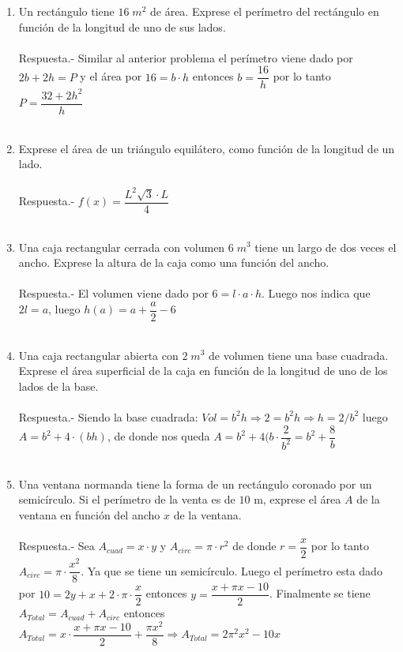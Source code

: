 \begin{enumerate}
    \item Un rectángulo tiene $16\; m^2$  de área. Exprese el perímetro del rectángulo en función de la longitud de uno de sus lados.\\\\
	Respuesta.-\; Similar al anterior problema el perímetro viene dado por $2b+2h=P$  y el área por $16=b\cdot h$ entonces $b=\dfrac{16}{h}$ por lo tanto $P=\dfrac{32+2h^2}{h}$\\\\ 

    \item Exprese el área de un triángulo equilátero, como función de la longitud de un lado.\\\\
	Respuesta.-\; $f(x)=\dfrac{L^2 \sqrt{3}\cdot L}{4}$\\\\

    \item Una caja rectangular cerrada con volumen $6\; m^3$ tiene un largo de dos veces el ancho. Exprese la altura de la caja como una función del ancho.\\\\
	Respuesta.-\; El volumen viene dado por $6=l\cdot a \cdot h$. Luego nos indica que $2l=a$, luego $h(a)=a + \dfrac{a}{2} - 6$\\\\

    \item Una caja rectangular abierta con $2 \; m^3$  de volumen tiene una base cuadrada. Exprese el área superficial de la caja en función de la longitud de uno de los lados de la base.\\\\
	Respuesta.-\; Siendo la base cuadrada:  $Vol=b^2h \Longrightarrow  2=b^2h \Longrightarrow  h=2/b^2$ luego $A=b^2 + 4\cdot (bh)$, de donde nos queda $A=b^2 + 4(b \cdot \dfrac{2}{b^2} = b^2 + \dfrac{8}{b}$\\\\

    \item Una ventana normanda tiene la forma de un rectángulo coronado por un semicírculo. Si el perímetro de la venta es de $10$ m, exprese el área $A$ de la ventana en función del ancho $x$ de la ventana.\\\\
	Respuesta.-\; Sea $A_{cuad} = x\cdot y$ y $A_{circ} = \pi \cdot r^2$  de donde  $r=\dfrac{x}{2}$ por lo tanto $A_{circ}=\pi \cdot \dfrac{x^2}{8}$. Ya que se tiene un semicírculo. Luego el perímetro esta dado por $10=2y + x  + 2\cdot \pi \cdot \dfrac{x}{2}$ entonces $y=\dfrac{x+\pi x - 10}{2}$. Finalmente se tiene $A_{Total} = A_{cuad} + A_{circ}$ entonces $A_{Total} = x \cdot \dfrac{x+\pi x - 10}{2} + \dfrac{\pi x^2}{8} \Longrightarrow A_{Total} = 2\pi^2x^2 - 10x$\\\\  


\end{enumerate}
